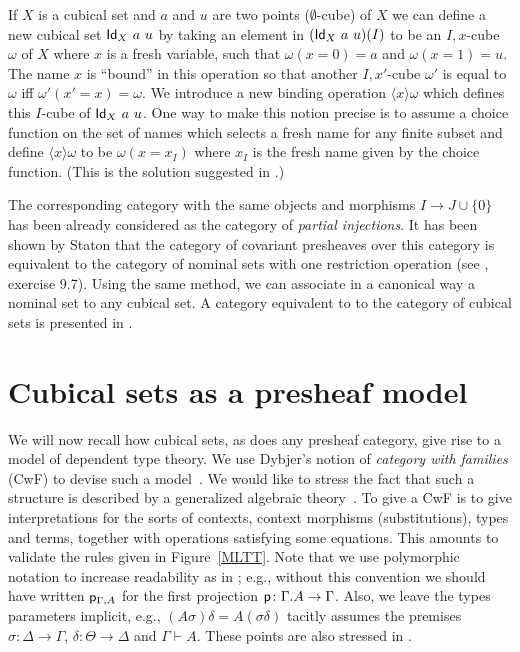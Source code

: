 \documentclass[10pt,a4paper]{article}
\newcommand{\Id}{{\sf Id}}
\newcommand{\pp}{{\sf p}}
\newcommand{\set}[1]{\{#1\}}
\newcommand{\es}{\emptyset}
\newcommand{\bind}[2]{{\langle}#1{\rangle}#2}
\begin{document}
 If $X$ is a cubical set and $a$ and $u$ are two points ($\es$-cube) of $X$ we can define a new cubical set $\Id_X~a~u$
by taking an element in $(\Id_X~a~u)(I)$ to be an $I,x$-cube $\omega$ of $X$ where $x$ is
a fresh variable, such that $\omega(x=0) = a$ and $\omega(x=1) = u$. The name $x$ is ``bound''
in this operation so that another $I,x'$-cube $\omega'$ is equal to $\omega$
iff $\omega'(x'=x) = \omega$.
We introduce a new binding operation $\bind{x}{\omega}$ which defines this $I$-cube of $\Id_X~a~u$.
One way to make this notion precise is to assume a choice function
on the set of names which selects a fresh name for any finite subset and define $\bind{x}{\omega}$ to be $\omega (x=x_I)$ where
$x_I$ is the fresh name given by the choice function. (This is the solution suggested in \cite{Stoughton}.)

\medskip

 The corresponding category with the same objects and morphisms $I \to J\cup\{0\}$ has been already
considered as the category of {\em partial injections}. It has been shown by Staton that the category of covariant
presheaves over this category is equivalent to the category of nominal sets with one restriction operation
(see \cite{pitts}, exercise 9.7). Using the same method, we can associate in a canonical way a nominal set
to any cubical set. A category equivalent to to the category of cubical sets is presented in \cite{Pitts}.

\section{Cubical sets as a presheaf model}
\label{sec:presheaf-models}

We will now recall how cubical sets, as does any presheaf category,
give rise to a model of dependent type theory.  We use Dybjer's notion
of \emph{category with families} (CwF) to devise such a
model~\cite{Dybjer,Curien,Hofmann}.  We would like to stress the fact
that such a structure is described by a generalized algebraic
theory~\cite{Cartmell}.  To give a CwF is to give interpretations for
the sorts of contexts, context morphisms (substitutions), types and
terms, together with operations satisfying some equations.  This
amounts to validate the rules given in Figure~\ref{MLTT}.  Note that
we use polymorphic notation to increase readability as in
\cite{Cartmell,Dybjer}; e.g., without this convention we should have
written $\pp_{\Gamma, A}$ for the first projection $\pp \colon
\Gamma.A \to \Gamma$.  Also, we leave the types parameters implicit,
e.g., $(A \sigma) \delta = A (\sigma \delta)$ tacitly assumes the
premises $\sigma \colon \Delta \to \Gamma$, $\delta \colon \Theta \to
\Delta$ and $\Gamma \vdash A$.  These points are also stressed in
\cite[Sec.~1]{VoevodskyCMU}.
\end{document}
